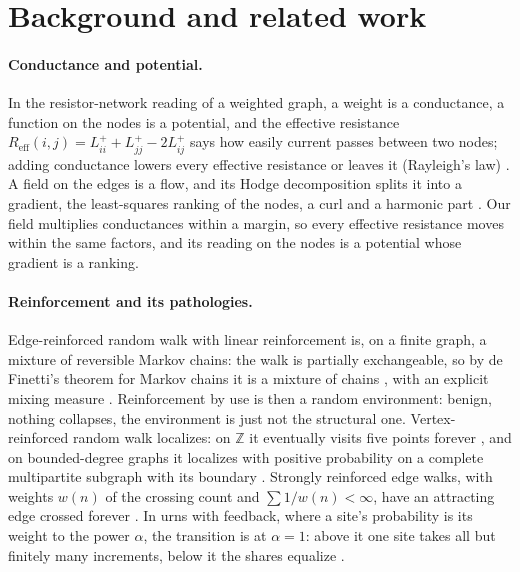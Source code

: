 \documentclass[11pt,a4paper]{article}
\theoremstyle{plain}
\theoremstyle{definition}
\begin{document}
\section{Background and related work}

\paragraph{Conductance and potential.}
In the resistor-network reading of a weighted graph, a weight is a conductance, a function on the
nodes is a potential, and the effective resistance $R_{\mathrm{eff}}(i,j) = L^+_{ii} + L^+_{jj} -
2L^+_{ij}$ says how easily current passes between two nodes; adding conductance lowers every
effective resistance or leaves it (Rayleigh's law) \cite{doylesnell1984}. A field on the edges is a
flow, and its Hodge decomposition splits it into a gradient, the least-squares ranking of the nodes,
a curl and a harmonic part \cite{jiang2011hodgerank}. Our field multiplies conductances within a
margin, so every effective resistance moves within the same factors, and its reading on the nodes
is a potential whose gradient is a ranking.

\paragraph{Reinforcement and its pathologies.}
Edge-reinforced random walk with linear reinforcement is, on a finite graph, a mixture of
reversible Markov chains: the walk is partially exchangeable, so by de Finetti's theorem for Markov
chains it is a mixture of chains \cite{diaconis1980definetti,diaconis1988recent}, with an explicit
mixing measure \cite{keane2000errw,rolles2003errw,merkl2005ladder,sabot2015errw}. Reinforcement by
use is then a random environment: benign, nothing collapses, the environment is just not the
structural one. Vertex-reinforced random walk localizes: on $\mathbb{Z}$ it eventually visits five
points forever \cite{pemantle1992vrrw,pemantle1999finite,tarres2004five}, and on bounded-degree
graphs it localizes with positive probability on a complete multipartite subgraph with its boundary
\cite{volkov2001vrrw,benaim2011dynamics}. Strongly reinforced edge walks, with weights $w(n)$ of the
crossing count and $\sum 1/w(n) < \infty$, have an attracting edge crossed forever
\cite{davis1990reinforced,limic2007attracting}. In urns with feedback, where a site's probability is
its weight to the power $\alpha$, the transition is at $\alpha = 1$: above it one site takes all but
finitely many increments, below it the shares equalize
\cite{drinea2002feedback,oliveira2009onset,pemantle2007survey}.
\end{document}
